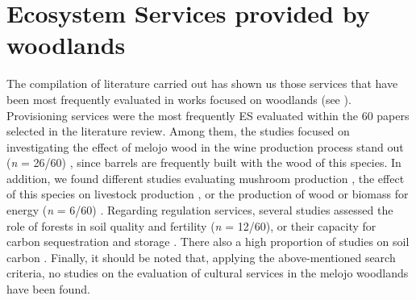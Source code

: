 \section{Ecosystem Services provided by \Qp woodlands}\label{sec:es:results}
The compilation of literature carried out has shown us those services that have been most frequently evaluated in works focused on \Qp woodlands (see ). Provisioning services were the most frequently ES evaluated within the 60 papers selected in the literature review. Among them, the studies focused on investigating the effect of melojo wood in the wine production process stand out (\emph{n} = 26/60) \autocites[\emph{e.g.}][]{FernandezdeSimonetal2010CharacterizationVolatile,CastroVazquezetal2013EvaluationPortuguese}, since barrels are frequently built with the wood of this species. In addition, we found different studies evaluating mushroom production \autocites[\emph{e.g.}][]{OriadeRuedaetal2010CouldArtificial}, the effect of this species on livestock production \autocites[\emph{e.g.}][]{Nunezetal2012LivestockManagement}, or the production of wood or biomass for energy (\emph{n} = 6/60) \autocites[\emph{e.g.}][]{Mirandaetal2009EnergeticCharacterization}. Regarding regulation services, several studies assessed the role of forests in soil quality and fertility (\emph{n} = 12/60), or their capacity for carbon sequestration and storage \autocites[\emph{n} = 12/60; \emph{e.g.}][]{Alvarezetal2014InfluenceTree}. There also a high proportion of studies on soil carbon \autocites[\emph{n} = 8/60; \emph{e.g.}][]{Fonsecaetal2019ImpactTree}. Finally, it should be noted that, applying the above-mentioned search criteria, no studies on the evaluation of cultural services in the melojo woodlands have been found.

